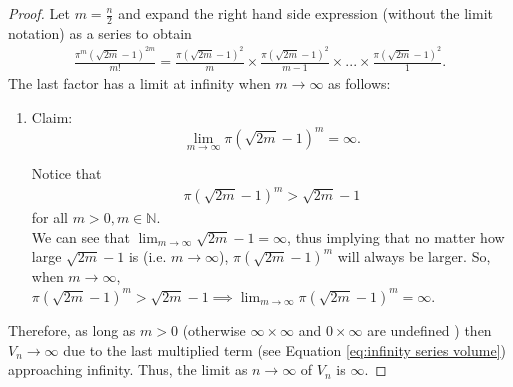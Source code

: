 \begin{proof}
    \noindent
    Let $m=\frac{n}{2}$ and expand the right hand side expression (without the limit notation) as a series to obtain
    \begin{align}\label{eq:infinity series volume}
        \frac{\pi^m{\left(\sqrt{2m}-1\right)}^{2m}}{m!}=\frac{\pi(\sqrt{2m}-1)^2}{m} \times \frac{\pi(\sqrt{2m}-1)^2}{m-1} \times ... \times \frac{\pi(\sqrt{2m}-1)^2}{1}.
    \end{align}
    The last factor has a limit at infinity when $m \to \infty$ as follows:
    \begin{enumerate}
        \item Claim: $$\lim_{m\to\infty}\pi\left(\sqrt{2m}-1\right)^m=\infty.$$
        \begin{subproof}[Subproof]
            Notice that 
            \begin{align*}
                \pi\left(\sqrt{2m}-1\right)^m > \sqrt{2m}-1
            \end{align*}
            for all $m>0, m \in \mathbb{N}$.\\ 
            We can see that $\lim_{m\to\infty}\sqrt{2m}-1=\infty$, thus implying that no matter how large $\sqrt{2m}-1$ is (i.e. $m\to\infty$), $\pi(\sqrt{2m}-1)^m$ will always be larger. So, when $m\to\infty$, $\pi(\sqrt{2m}-1)^m > \sqrt{2m}-1 \implies \lim_{m\to\infty}\pi(\sqrt{2m}-1)^m=\infty$.
        \end{subproof}
    \end{enumerate}
    Therefore, as long as $m > 0$ (otherwise $\infty\times\infty$ and $0\times\infty$ are undefined \cite{al2008indeterminate}) then $V_n \to \infty$ due to the last multiplied term (see Equation \ref{eq:infinity series volume}) approaching infinity. Thus, the limit as $n \to \infty$ of $V_n$ is $\infty$. 
\end{proof}

